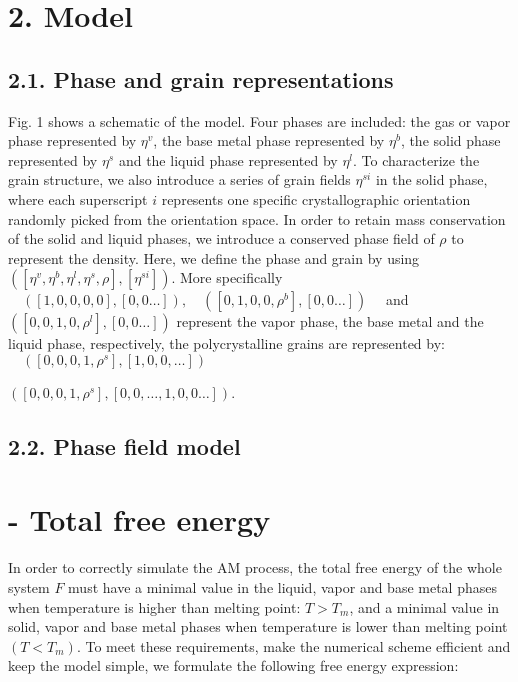 \documentclass[10pt]{article}
\begin{document}
\section*{2. Model}
\subsection*{2.1. Phase and grain representations}
Fig. 1 shows a schematic of the model. Four phases are included: the gas or vapor phase represented by $\eta^{v}$, the base metal phase represented by $\eta^{b}$, the solid phase represented by $\eta^{s}$ and the liquid phase represented by $\eta^{l}$. To characterize the grain structure, we also introduce a series of grain fields $\eta^{s i}$ in the solid phase, where each superscript $i$ represents one specific crystallographic orientation randomly picked from the orientation space. In order to retain mass conservation of the solid and liquid phases, we introduce a conserved phase field of $\rho$ to represent the density. Here, we define the phase and grain by using $\left(\left[\eta^{v}, \eta^{b}, \eta^{l}, \eta^{s}, \rho\right],\left[\eta^{s i}\right]\right)$. More specifically $\quad([1,0,0,0,0],[0,0 \ldots]), \quad\left(\left[0,1,0,0, \rho^{b}\right],[0,0 \ldots]\right) \quad$ and $\left(\left[0,0,1,0, \rho^{l}\right],[0,0 \ldots]\right)$ represent the vapor phase, the base metal and the liquid phase, respectively, the polycrystalline grains are represented by: $\quad\left(\left[0,0,0,1, \rho^{s}\right],[1,0,0, \ldots]\right)$

$\left(\left[0,0,0,1, \rho^{s}\right],[0,0, \ldots, 1,0,0 \ldots]\right)$.

\subsection*{2.2. Phase field model}
\section*{- Total free energy}
In order to correctly simulate the AM process, the total free energy of the whole system $F$ must have a minimal value in the liquid, vapor and base metal phases when temperature is higher than melting point: $T>T_{m}$, and a minimal value in solid, vapor and base metal phases when temperature is lower than melting point $\left(T<T_{m}\right)$. To meet these requirements, make the numerical scheme efficient and keep the model simple, we formulate the following free energy expression:
\end{document}
